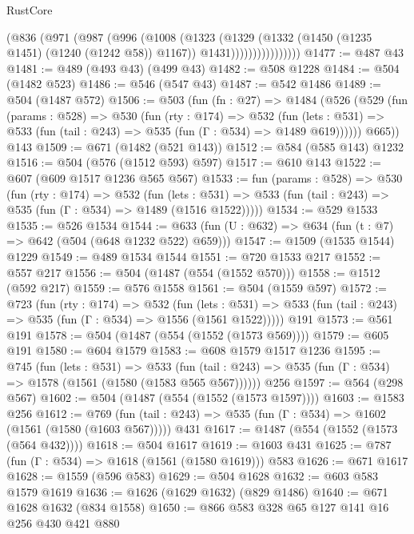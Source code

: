 \begin{lexlean}{RustCore}
\begin{coremodule}
{\begin{coremodule}
{{{{{{{                      (@836
                        (@971
                          (@987
                            (@996
                              (@1008
                                (@1323
                                  (@1329
                                    (@1332 (@1450 (@1235 @1451) (@1240 (@1242 @58)) @1167))
                                    @1431))))))))))))))))
@1477 := @487 @43
@1481 := @489 (@493 @43) (@499 @43)
@1482 := @508 @1228
@1484 := @504 (@1482 @523)
@1486 := @546 (@547 @43)
@1487 := @542 @1486
@1489 := @504 (@1487 @572)
@1506 := @503
    (fun (fn : @27) =>
    @1484
      (@526
        (@529
          (fun (params : @528) =>
          @530
            (fun (rty : @174) =>
            @532
              (fun (lets : @531) =>
              @533 (fun (tail : @243) => @535 (fun (Γ : @534) => @1489 @619))))))
        @665))
    @143
@1509 := @671 (@1482 (@521 @143))
@1512 := @584 (@585 @143) @1232
@1516 := @504 (@576 (@1512 @593) @597)
@1517 := @610 @143
@1522 := @607 (@609 @1517 @1236 @565 @567)
@1533 := fun (params : @528) =>
  @530
    (fun (rty : @174) =>
    @532
      (fun (lets : @531) =>
      @533 (fun (tail : @243) => @535 (fun (Γ : @534) => @1489 (@1516 @1522)))))
@1534 := @529 @1533
@1535 := @526 @1534
@1544 := @633 (fun (U : @632) => @634 (fun (t : @7) => @642 (@504 (@648 @1232 @522) @659)))
@1547 := @1509 (@1535 @1544) @1229
@1549 := @489 @1534 @1544
@1551 := @720 @1533 @217
@1552 := @557 @217
@1556 := @504 (@1487 (@554 (@1552 @570)))
@1558 := @1512 (@592 @217)
@1559 := @576 @1558
@1561 := @504 (@1559 @597)
@1572 := @723
    (fun (rty : @174) =>
    @532
      (fun (lets : @531) =>
      @533 (fun (tail : @243) => @535 (fun (Γ : @534) => @1556 (@1561 @1522)))))
    @191
@1573 := @561 @191
@1578 := @504 (@1487 (@554 (@1552 (@1573 @569))))
@1579 := @605 @191
@1580 := @604 @1579
@1583 := @608 @1579 @1517 @1236
@1595 := @745
    (fun (lets : @531) =>
    @533 (fun (tail : @243) => @535 (fun (Γ : @534) => @1578 (@1561 (@1580 (@1583 @565 @567))))))
    @256
@1597 := @564 (@298 @567)
@1602 := @504 (@1487 (@554 (@1552 (@1573 @1597))))
@1603 := @1583 @256
@1612 := @769
    (fun (tail : @243) => @535 (fun (Γ : @534) => @1602 (@1561 (@1580 (@1603 @567)))))
    @431
@1617 := @1487 (@554 (@1552 (@1573 (@564 @432))))
@1618 := @504 @1617
@1619 := @1603 @431
@1625 := @787 (fun (Γ : @534) => @1618 (@1561 (@1580 @1619))) @583
@1626 := @671 @1617
@1628 := @1559 (@596 @583)
@1629 := @504 @1628
@1632 := @603 @583 @1579 @1619
@1636 := @1626 (@1629 @1632) (@829 @1486)
@1640 := @671 @1628 @1632 (@834 @1558)
@1650 := @866 @583 @328 @65 @127 @141 @16 @256 @430 @421 @880
}}}}}}}
\end{coremodule}}
\end{coremodule}
\end{lexlean}
